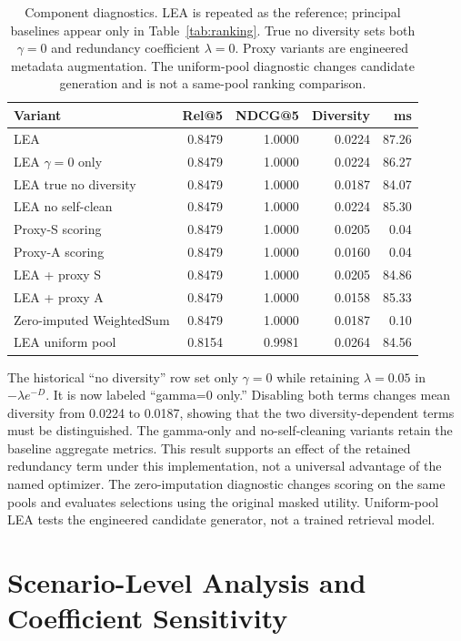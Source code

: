 \documentclass[12pt,a4paper]{article}
\begin{document}
\begin{table}[H]\centering\small
\caption{Component diagnostics. LEA is repeated as the reference; principal baselines appear only in Table~\ref{tab:ranking}. True no diversity sets both $\gamma=0$ and redundancy coefficient $\lambda=0$. Proxy variants are engineered metadata augmentation. The uniform-pool diagnostic changes candidate generation and is not a same-pool ranking comparison.}\label{tab:ablation}
\begin{tabular}{lrrrr}
\toprule
Variant & Rel@5 & NDCG@5 & Diversity & ms\\\midrule
LEA & 0.8479 & 1.0000 & 0.0224 & 87.26\\
LEA $\gamma=0$ only & 0.8479 & 1.0000 & 0.0224 & 86.27\\
LEA true no diversity & 0.8479 & 1.0000 & 0.0187 & 84.07\\
LEA no self-clean & 0.8479 & 1.0000 & 0.0224 & 85.30\\
Proxy-S scoring & 0.8479 & 1.0000 & 0.0205 & 0.04\\
Proxy-A scoring & 0.8479 & 1.0000 & 0.0160 & 0.04\\
LEA + proxy S & 0.8479 & 1.0000 & 0.0205 & 84.86\\
LEA + proxy A & 0.8479 & 1.0000 & 0.0158 & 85.33\\
Zero-imputed WeightedSum & 0.8479 & 1.0000 & 0.0187 & 0.10\\
LEA uniform pool & 0.8154 & 0.9981 & 0.0264 & 84.56\\
\bottomrule\end{tabular}\end{table}
The historical ``no diversity'' row set only $\gamma=0$ while retaining $\lambda=0.05$ in $-\lambda e^{-D}$. It is now labeled ``gamma=0 only.'' Disabling both terms changes mean diversity from 0.0224 to 0.0187, showing that the two diversity-dependent terms must be distinguished. The gamma-only and no-self-cleaning variants retain the baseline aggregate metrics. This result supports an effect of the retained redundancy term under this implementation, not a universal advantage of the named optimizer. The zero-imputation diagnostic changes scoring on the same pools and evaluates selections using the original masked utility. Uniform-pool LEA tests the engineered candidate generator, not a trained retrieval model.

\section{Scenario-Level Analysis and Coefficient Sensitivity}
\label{sec:stats}
\end{document}
